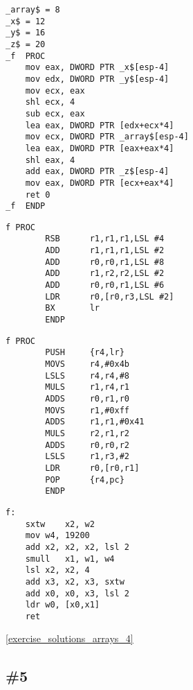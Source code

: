 \begin{lstlisting}[caption=\Optimizing MSVC 2010]
_array$ = 8	
_x$ = 12	
_y$ = 16	
_z$ = 20	
_f	PROC
	mov	eax, DWORD PTR _x$[esp-4]
	mov	edx, DWORD PTR _y$[esp-4]
	mov	ecx, eax
	shl	ecx, 4
	sub	ecx, eax
	lea	eax, DWORD PTR [edx+ecx*4]
	mov	ecx, DWORD PTR _array$[esp-4]
	lea	eax, DWORD PTR [eax+eax*4]
	shl	eax, 4
	add	eax, DWORD PTR _z$[esp-4]
	mov	eax, DWORD PTR [ecx+eax*4]
	ret	0
_f	ENDP
\end{lstlisting}

\begin{lstlisting}[caption=\NonOptimizingKeilVI (\ARMMode)]
f PROC
        RSB      r1,r1,r1,LSL #4
        ADD      r1,r1,r1,LSL #2
        ADD      r0,r0,r1,LSL #8
        ADD      r1,r2,r2,LSL #2
        ADD      r0,r0,r1,LSL #6
        LDR      r0,[r0,r3,LSL #2]
        BX       lr
        ENDP
\end{lstlisting}

\begin{lstlisting}[caption=\NonOptimizingKeilVI (\ThumbMode)]
f PROC
        PUSH     {r4,lr}
        MOVS     r4,#0x4b
        LSLS     r4,r4,#8
        MULS     r1,r4,r1
        ADDS     r0,r1,r0
        MOVS     r1,#0xff
        ADDS     r1,r1,#0x41
        MULS     r2,r1,r2
        ADDS     r0,r0,r2
        LSLS     r1,r3,#2
        LDR      r0,[r0,r1]
        POP      {r4,pc}
        ENDP
\end{lstlisting}

\begin{lstlisting}[caption=\Optimizing GCC 4.9 (ARM64)]
f:
	sxtw	x2, w2
	mov	w4, 19200
	add	x2, x2, x2, lsl 2
	smull	x1, w1, w4
	lsl	x2, x2, 4
	add	x3, x2, x3, sxtw
	add	x0, x0, x3, lsl 2
	ldr	w0, [x0,x1]
	ret
\end{lstlisting}



\Answer\: \ref{exercise_solutions_arrays_4}

\subsection{\Exercise \#5}
\label{exercise_array_5}

\WhatThisCodeDoes\

